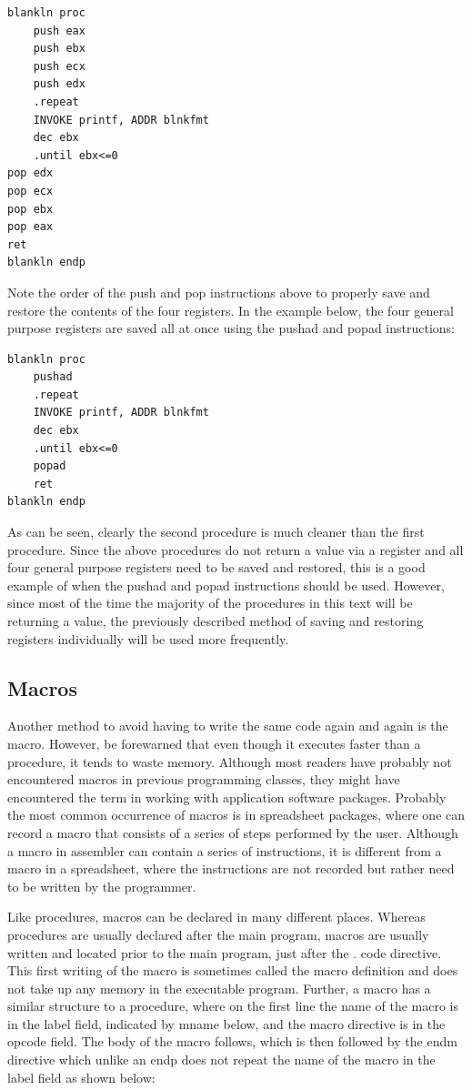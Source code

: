 \documentclass[10pt]{book}
\begin{document}
\begin{verbatim}
blankln proc
    push eax
    push ebx
    push ecx
    push edx
    .repeat
    INVOKE printf, ADDR blnkfmt
    dec ebx
    .until ebx<=0
pop edx
pop ecx
pop ebx
pop eax
ret
blankln endp
\end{verbatim}

Note the order of the push and pop instructions above to properly save and restore the contents of the four registers. In the example below, the four general purpose registers are saved all at once using the pushad and popad instructions:

\begin{verbatim}
blankln proc
    pushad
    .repeat
    INVOKE printf, ADDR blnkfmt
    dec ebx
    .until ebx<=0
    popad
    ret
blankln endp
\end{verbatim}

As can be seen, clearly the second procedure is much cleaner than the first procedure. Since the above procedures do not return a value via a register and all four general purpose registers need to be saved and restored, this is a good example of when the pushad and popad instructions should be used. However, since most of the time the majority of the procedures in this text will be returning a value, the previously described method of saving and restoring registers individually will be used more frequently.

\subsection{Macros}
Another method to avoid having to write the same code again and again is the macro. However, be forewarned that even though it executes faster than a procedure, it tends to waste memory. Although most readers have probably not encountered macros in previous programming classes, they might have encountered the term in working with application software packages. Probably the most common occurrence of macros is in spreadsheet packages, where one can record a macro that consists of a series of steps performed by the user. Although a macro in assembler can contain a series of instructions, it is different from a macro in a spreadsheet, where the instructions are not recorded but rather need to be written by the programmer.

Like procedures, macros can be declared in many different places. Whereas procedures are usually declared after the main program, macros are usually written and located prior to the main program, just after the . code directive. This first writing of the macro is sometimes called the macro definition and does not take up any memory in the executable program. Further, a macro has a similar structure to a procedure, where on the first line the name of the macro is in the label field, indicated by mname below, and the macro directive is in the opcode field. The body of the macro follows, which is then followed by the endm directive which unlike an endp does not repeat the name of the macro in the label field as shown below:
\end{document}
